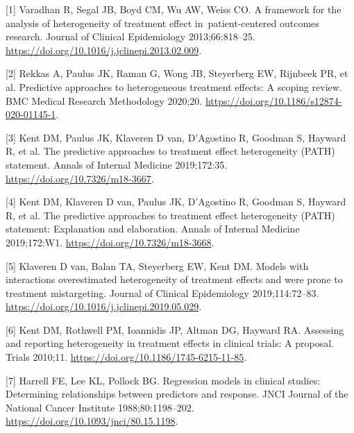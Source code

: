 \documentclass{article}
\newenvironment{cslreferences}%
  {}%
  {\par}
\begin{document}
\setlength{\parindent}{-0.25in}
\setlength{\leftskip}{0.25in}

\noindent

\hypertarget{refs}{}
\begin{cslreferences}
\leavevmode\hypertarget{ref-Varadhan2013}{}%
{[}1{]} Varadhan R, Segal JB, Boyd CM, Wu AW, Weiss CO. A framework for
the analysis of heterogeneity of treatment effect in~patient-centered
outcomes research. Journal of Clinical Epidemiology 2013;66:818--25.
\url{https://doi.org/10.1016/j.jclinepi.2013.02.009}.

\leavevmode\hypertarget{ref-Rekkas2020}{}%
{[}2{]} Rekkas A, Paulus JK, Raman G, Wong JB, Steyerberg EW, Rijnbeek
PR, et al. Predictive approaches to heterogeneous treatment effects: A
scoping review. BMC Medical Research Methodology 2020;20.
\url{https://doi.org/10.1186/s12874-020-01145-1}.

\leavevmode\hypertarget{ref-Kent2019}{}%
{[}3{]} Kent DM, Paulus JK, Klaveren D van, D'Agostino R, Goodman S,
Hayward R, et al. The predictive approaches to treatment effect
heterogeneity (PATH) statement. Annals of Internal Medicine 2019;172:35.
\url{https://doi.org/10.7326/m18-3667}.

\leavevmode\hypertarget{ref-PathEnE}{}%
{[}4{]} Kent DM, Klaveren D van, Paulus JK, D'Agostino R, Goodman S,
Hayward R, et al. The predictive approaches to treatment effect
heterogeneity (PATH) statement: Explanation and elaboration. Annals of
Internal Medicine 2019;172:W1. \url{https://doi.org/10.7326/m18-3668}.

\leavevmode\hypertarget{ref-vanKlaveren2019}{}%
{[}5{]} Klaveren D van, Balan TA, Steyerberg EW, Kent DM. Models with
interactions overestimated heterogeneity of treatment effects and were
prone to treatment mistargeting. Journal of Clinical Epidemiology
2019;114:72--83. \url{https://doi.org/10.1016/j.jclinepi.2019.05.029}.

\leavevmode\hypertarget{ref-Kent2010}{}%
{[}6{]} Kent DM, Rothwell PM, Ioannidis JP, Altman DG, Hayward RA.
Assessing and reporting heterogeneity in treatment effects in clinical
trials: A proposal. Trials 2010;11.
\url{https://doi.org/10.1186/1745-6215-11-85}.

\leavevmode\hypertarget{ref-Harrell1988}{}%
{[}7{]} Harrell FE, Lee KL, Pollock BG. Regression models in clinical
studies: Determining relationships between predictors and response. JNCI
Journal of the National Cancer Institute 1988;80:1198--202.
\url{https://doi.org/10.1093/jnci/80.15.1198}.


\end{cslreferences}
\end{document}
